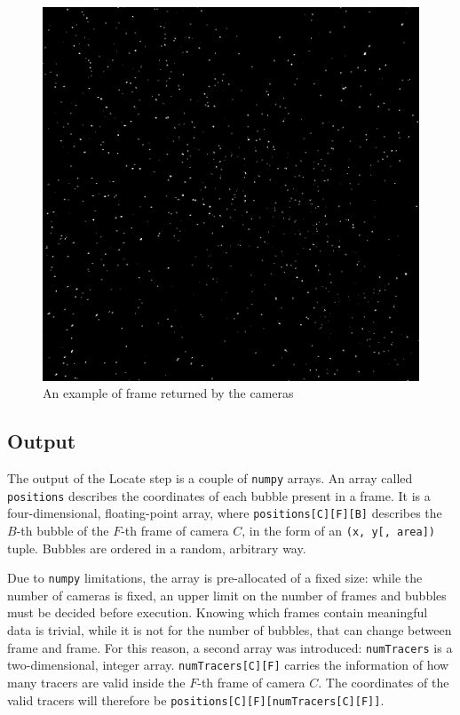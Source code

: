 \begin{figure}
	\centerline{\includegraphics[width=\locateimgsize]{images/locate/_original-frame.png}}
	\caption{\centering An example of frame returned by the cameras}
	\label{fig:locate:original}
\end{figure}

\subsection{Output}

The output of the Locate step is a couple of \texttt{numpy} arrays.
An array called \texttt{positions} describes the coordinates of each bubble present in a frame. It is a four-dimensional, floating-point array, where \texttt{positions[C][F][B]} describes the $B$-th bubble of the $F$-th frame of camera $C$, in the form of an \texttt{(x, y[, area])} tuple.
Bubbles are ordered in a random, arbitrary way.

Due to \texttt{numpy} limitations, the array is pre-allocated of a fixed size: while the number of cameras is fixed, an upper limit on the number of frames and bubbles must be decided before execution.
Knowing which frames contain meaningful data is trivial, while it is not for the number of bubbles, that can change between frame and frame.
For this reason, a second array was introduced: \texttt{numTracers} is a two-dimensional, integer array.
\texttt{numTracers[C][F]} carries the information of how many tracers are valid inside the $F$-th frame of camera $C$.
The coordinates of the valid tracers will therefore be \texttt{positions[C][F][numTracers[C][F]]}.

